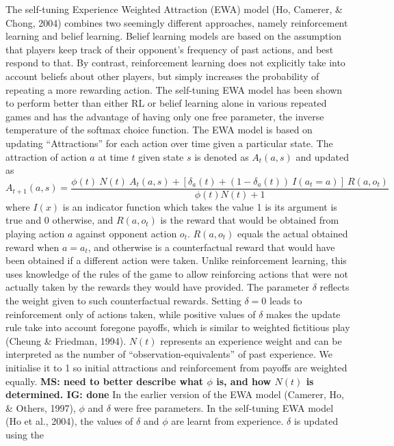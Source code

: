 \documentclass[english,man,floatsintext]{apa6}
\begin{document}
The self-tuning Experience Weighted Attraction (EWA) model (Ho, Camerer, \& Chong, 2004) combines two seemingly different approaches, namely reinforcement learning and belief learning. Belief learning models are based on the assumption that players keep track of their opponent's frequency of past actions, and best respond to that. By contrast, reinforcement learning does not explicitly take into account beliefs about other players, but simply increases the probability of repeating a more rewarding action. The self-tuning EWA model has been shown to perform better than either RL or belief learning alone in various repeated games and has the advantage of having only one free parameter, the inverse temperature of the softmax choice function. The EWA model is based on updating ``Attractions'' for each action over time given a particular state. The attraction of action \(a\) at time \(t\) given state \(s\) is denoted as \(A_{t}(a, s)\) and updated as
\[ A_{t+1}(a,s) =  \frac{\phi(t) \ N(t) \ A_{t}(a,s) + [ \delta_{a}(t) + (1-\delta_{a}(t)) \ I(a_t = a )] \ R(a,o_t) } {\phi(t)N(t) + 1} \]
where \(I(x)\) is an indicator function which takes the value 1 is its argument is true and 0 otherwise, and \(R(a,o_t)\) is the reward that would be obtained from playing action \(a\) against opponent action \(o_t\). \(R(a,o_t)\) equals the actual obtained reward when \(a = a_t\), and otherwise is a counterfactual reward that would have been obtained if a different action were taken. Unlike reinforcement learning, this uses knowledge of the rules of the game to allow reinforcing actions that were not actually taken by the rewards they would have provided. The parameter \(\delta\) reflects the weight given to such counterfactual rewards. Setting \(\delta = 0\) leads to reinforcement only of actions taken, while positive values of \(\delta\) makes the update rule take into account foregone payoffs, which is similar to weighted fictitious play (Cheung \& Friedman, 1994). \(N(t)\) represents an experience weight and can be interpreted as the number of \enquote{observation-equivalents} of past experience. We initialise it to 1 so initial attractions and reinforcement from payoffs are weighted equally. \textbf{MS: need to better describe what \(\phi\) is, and how \(N(t)\) is determined. IG: done} In the earlier version of the EWA model (Camerer, Ho, \& Others, 1997), \(\phi\) and \(\delta\) were free parameters. In the self-tuning EWA model (Ho et al., 2004), the values of \(\delta\) and \(\phi\) are learnt from experience. \(\delta\) is updated using the
\end{document}
